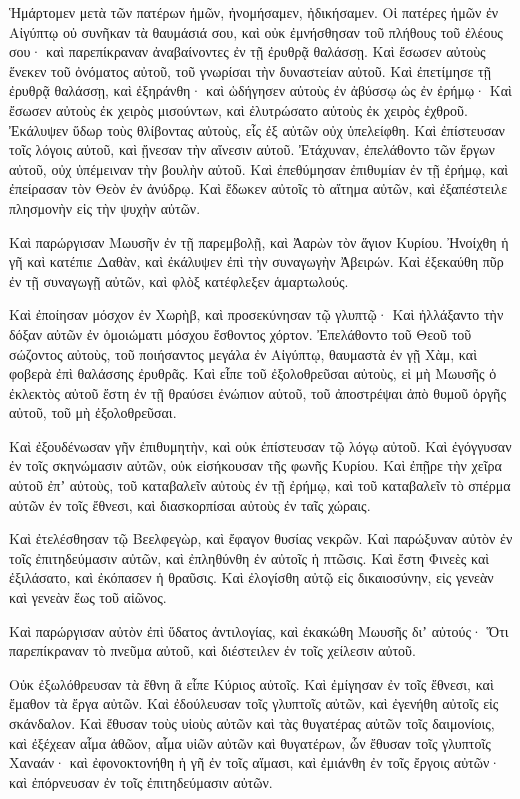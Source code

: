 \begin{spacing}{1.1}
\begin{multicols}{2}
Ἡμάρτομεν μετὰ τῶν πατέρων ἡμῶν, ἠνομήσαμεν, ἠδικήσαμεν.
Οἱ πατέρες ἡμῶν ἐν Αἰγύπτῳ οὐ συνῆκαν τὰ θαυμάσιά σου, καὶ οὐκ ἐμνήσθησαν τοῦ πλήθους τοῦ ἐλέους σου· καὶ παρεπίκραναν ἀναβαίνοντες ἐν τῇ ἐρυθρᾷ θαλάσσῃ.
Καὶ ἔσωσεν αὐτοὺς ἕνεκεν τοῦ ὀνόματος αὐτοῦ, τοῦ γνωρίσαι τὴν δυναστείαν αὐτοῦ.
Καὶ ἐπετίμησε τῇ ἐρυθρᾷ θαλάσσῃ, καὶ ἐξηράνθη· καὶ ὡδήγησεν αὐτοὺς ἐν ἀβύσσῳ ὡς ἐν ἐρήμῳ·
Καὶ ἔσωσεν αὐτοὺς ἐκ χειρὸς μισούντων, καὶ ἐλυτρώσατο αὐτοὺς ἐκ χειρὸς ἐχθροῦ.
Ἐκάλυψεν ὕδωρ τοὺς θλίβοντας αὐτοὺς, εἷς ἐξ αὐτῶν οὐχ ὑπελείφθη.
Καὶ ἐπίστευσαν τοῖς λόγοις αὐτοῦ, καὶ ᾔνεσαν τὴν αἴνεσιν αὐτοῦ.
Ἐτάχυναν, ἐπελάθοντο τῶν ἔργων αὐτοῦ, οὐχ ὑπέμειναν τὴν βουλὴν αὐτοῦ.
Καὶ ἐπεθύμησαν ἐπιθυμίαν ἐν τῇ ἐρήμῳ, καὶ ἐπείρασαν τὸν Θεὸν ἐν ἀνύδρῳ.
Καὶ ἔδωκεν αὐτοῖς τὸ αἴτημα αὐτῶν, καὶ ἐξαπέστειλε πλησμονὴν εἰς τὴν ψυχὴν αὐτῶν.

Καὶ παρώργισαν Μωυσῆν ἐν τῇ παρεμβολῇ, καὶ Ἀαρὼν τὸν ἅγιον Κυρίου.
Ἠνοίχθη ἡ γῆ καὶ κατέπιε Δαθὰν, καὶ ἐκάλυψεν ἐπὶ τὴν συναγωγὴν Ἀβειρών.
Καὶ ἐξεκαύθη πῦρ ἐν τῇ συναγωγῇ αὐτῶν, καὶ φλὸξ κατέφλεξεν ἁμαρτωλούς.

Καὶ ἐποίησαν μόσχον ἐν Χωρὴβ, καὶ προσεκύνησαν τῷ γλυπτῷ·
Καὶ ἠλλάξαντο τὴν δόξαν αὐτῶν ἐν ὁμοιώματι μόσχου ἔσθοντος χόρτον.
Ἐπελάθοντο τοῦ Θεοῦ τοῦ σώζοντος αὐτοὺς, τοῦ ποιήσαντος μεγάλα ἐν Αἰγύπτῳ,
θαυμαστὰ ἐν γῇ Χὰμ, καὶ φοβερὰ ἐπὶ θαλάσσης ἐρυθρᾶς.
Καὶ εἶπε τοῦ ἐξολοθρεῦσαι αὐτοὺς, εἰ μὴ Μωυσῆς ὁ ἐκλεκτὸς αὐτοῦ ἔστη ἐν τῇ θραύσει ἐνώπιον αὐτοῦ, τοῦ ἀποστρέψαι ἀπὸ θυμοῦ ὀργῆς αὐτοῦ, τοῦ μὴ ἐξολοθρεῦσαι.

Καὶ ἐξουδένωσαν γῆν ἐπιθυμητὴν, καὶ οὐκ ἐπίστευσαν τῷ λόγῳ αὐτοῦ.
Καὶ ἐγόγγυσαν ἐν τοῖς σκηνώμασιν αὐτῶν, οὐκ εἰσήκουσαν τῆς φωνῆς Κυρίου.
Καὶ ἐπῇρε τὴν χεῖρα αὐτοῦ ἐπʼ αὐτοὺς, τοῦ καταβαλεῖν αὐτοὺς ἐν τῇ ἐρήμῳ,
καὶ τοῦ καταβαλεῖν τὸ σπέρμα αὐτῶν ἐν τοῖς ἔθνεσι, καὶ διασκορπίσαι αὐτοὺς ἐν ταῖς χώραις.

Καὶ ἐτελέσθησαν τῷ Βεελφεγὼρ, καὶ ἔφαγον θυσίας νεκρῶν.
Καὶ παρώξυναν αὐτὸν ἐν τοῖς ἐπιτηδεύμασιν αὐτῶν, καὶ ἐπληθύνθη ἐν αὐτοῖς ἡ πτῶσις.
Καὶ ἔστη Φινεὲς καὶ ἐξιλάσατο, καὶ ἐκόπασεν ἡ θραῦσις.
Καὶ ἐλογίσθη αὐτῷ εἰς δικαιοσύνην, εἰς γενεὰν καὶ γενεὰν ἕως τοῦ αἰῶνος.

Καὶ παρώργισαν αὐτὸν ἐπὶ ὕδατος ἀντιλογίας, καὶ ἐκακώθη Μωυσῆς διʼ αὐτούς·
Ὅτι παρεπίκραναν τὸ πνεῦμα αὐτοῦ, καὶ διέστειλεν ἐν τοῖς χείλεσιν αὐτοῦ.

Οὐκ ἐξωλόθρευσαν τὰ ἔθνη ἃ εἶπε Κύριος αὐτοῖς.
Καὶ ἐμίγησαν ἐν τοῖς ἔθνεσι, καὶ ἔμαθον τὰ ἔργα αὐτῶν.
Καὶ ἐδούλευσαν τοῖς γλυπτοῖς αὐτῶν, καὶ ἐγενήθη αὐτοῖς εἰς σκάνδαλον.
Καὶ ἔθυσαν τοὺς υἱοὺς αὐτῶν καὶ τὰς θυγατέρας αὐτῶν τοῖς δαιμονίοις,
καὶ ἐξέχεαν αἷμα ἀθῶον, αἷμα υἱῶν αὐτῶν καὶ θυγατέρων, ὧν ἔθυσαν τοῖς γλυπτοῖς Χαναάν· καὶ ἐφονοκτονήθη ἡ γῆ ἐν τοῖς αἵμασι,
καὶ ἐμιάνθη ἐν τοῖς ἔργοις αὐτῶν· καὶ ἐπόρνευσαν ἐν τοῖς ἐπιτηδεύμασιν αὐτῶν.


\end{multicols}
\end{spacing}
